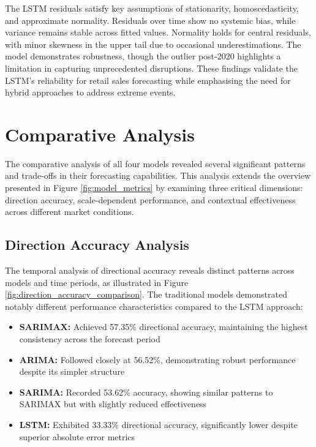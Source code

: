 \documentclass[12pt,a4paper]{report}
\begin{document}
The LSTM residuals satisfy key assumptions of stationarity, homoscedasticity, and approximate normality. Residuals over time show no systemic bias, while variance remains stable across fitted values. Normality holds for central residuals, with minor skewness in the upper tail due to occasional underestimations. The model demonstrates robustness, though the outlier post-2020 highlights a limitation in capturing unprecedented disruptions. These findings validate the LSTM’s reliability for retail sales forecasting while emphasising the need for hybrid approaches to address extreme events.

\section{Comparative Analysis}

The comparative analysis of all four models revealed several significant patterns and trade-offs in their forecasting capabilities. This analysis extends the overview presented in Figure \ref{fig:model_metrics} by examining three critical dimensions: direction accuracy, scale-dependent performance, and contextual effectiveness across different market conditions.

\subsection{Direction Accuracy Analysis}
\label{subsec:directional_accuracy}

The temporal analysis of directional accuracy reveals distinct patterns across models and time periods, as illustrated in Figure \ref{fig:direction_accuracy_comparison}. The traditional models demonstrated notably different performance characteristics compared to the LSTM approach:

\begin{itemize}
    \item \textbf{SARIMAX:} Achieved 57.35\% directional accuracy, maintaining the highest consistency across the forecast period
    \item \textbf{ARIMA:} Followed closely at 56.52\%, demonstrating robust performance despite its simpler structure
    \item \textbf{SARIMA:} Recorded 53.62\% accuracy, showing similar patterns to SARIMAX but with slightly reduced effectiveness
    \item \textbf{LSTM:} Exhibited 33.33\% directional accuracy, significantly lower despite superior absolute error metrics
\end{itemize}
\end{document}
